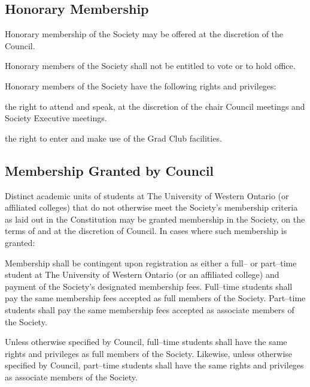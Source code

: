 \subsection{Honorary Membership}
	\begin{longenum}[label*=\thesubsection\arabic*., align=left]
	\item Honorary membership of the Society may be offered at the discretion of the Council. 
    \item Honorary members of the Society shall not be entitled to vote or to hold office.
    \item Honorary members of the Society have the following rights and privileges:
    	\begin{longenum}[label*=\arabic*., align=left]
    	\item the right to attend and speak, at the discretion of the chair Council meetings and Society Executive meetings.
        \item the right to enter and make use of the Grad Club facilities.
  	\end{longenum}
\end{longenum}

\subsection{Membership Granted by Council}
	\begin{longenum}[label*=\thesubsection\arabic*., align=left]
	\item Distinct academic units of students at The University of Western Ontario (or affiliated colleges) that do not otherwise meet the Society's membership criteria as laid out in the Constitution may be granted membership in the Society, on the terms of and at the discretion of Council. In cases where such membership is granted: 
    	\begin{longenum}[label*=\arabic*., align=left]
    	\item Membership shall be contingent upon registration as either a full-- or part--time student at The University of  Western Ontario (or an affiliated college) and payment of the Society's designated membership fees. Full--time students shall pay the same membership fees accepted as full members of the Society. Part--time students shall pay the same membership fees accepted as associate members of the Society.
        \item Unless otherwise specified by Council, full--time students shall have the same rights and privileges as full members of the Society. Likewise, unless otherwise specified by Council, part--time students shall have the same rights and privileges as associate members of the Society.
  	\end{longenum}
\end{longenum}

